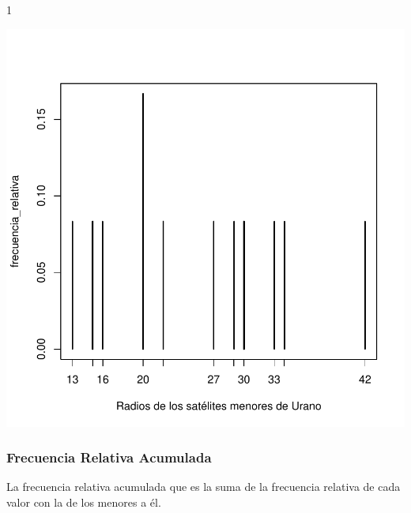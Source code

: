 \documentclass [a4paper] {article}
\begin{document}
\begin{Schunk}
\begin{Soutput}
[1] 1
\end{Soutput}
\end{Schunk}
\begin{center}
\includegraphics{entrega-frecuencia_relativa_satelites_plot}
\end{center}

\newpage
\subsubsection{Frecuencia Relativa Acumulada}
La frecuencia relativa acumulada que es la suma de la frecuencia relativa de cada valor con la de los menores a él.
\end{document}
